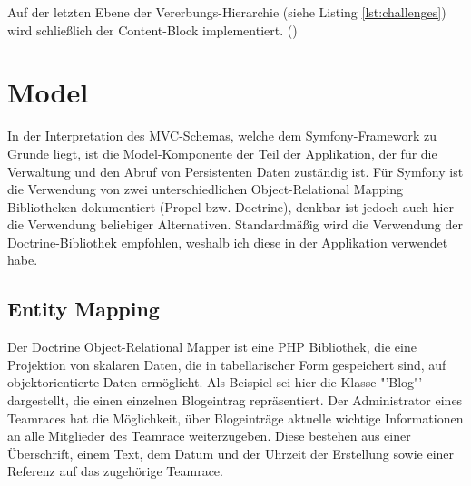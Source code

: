 \documentclass[12pt]{report}
\begin{document}
Auf der letzten Ebene der Vererbungs-Hierarchie (siehe Listing \ref{lst:challenges}) wird schließlich der Content-Block implementiert.
(\cite{Twig})

\section{Model}

In der Interpretation des MVC-Schemas, welche dem Symfony-Framework zu Grunde liegt, ist die Model-Komponente der Teil der Applikation, der für die Verwaltung und den Abruf von Persistenten Daten zuständig ist. Für Symfony ist die Verwendung von zwei unterschiedlichen Object-Relational Mapping Bibliotheken dokumentiert (Propel bzw. Doctrine), denkbar ist jedoch auch hier die Verwendung beliebiger Alternativen. Standardmäßig wird die Verwendung der Doctrine-Bibliothek empfohlen, weshalb ich diese in der Applikation verwendet habe.

\subsection{Entity Mapping}
\label{entityMapping}
 
Der Doctrine Object-Relational Mapper ist eine PHP Bibliothek, die eine Projektion von skalaren Daten, die in tabellarischer Form gespeichert sind, auf objektorientierte Daten ermöglicht. Als Beispiel sei hier die Klasse "'Blog"' dargestellt, die einen einzelnen Blogeintrag repräsentiert. Der Administrator eines Teamraces hat die Möglichkeit, über Blogeinträge aktuelle wichtige Informationen an alle Mitglieder des Teamrace weiterzugeben. Diese bestehen aus einer Überschrift, einem Text, dem Datum und der Uhrzeit der Erstellung sowie einer Referenz auf das zugehörige Teamrace.
\end{document}
